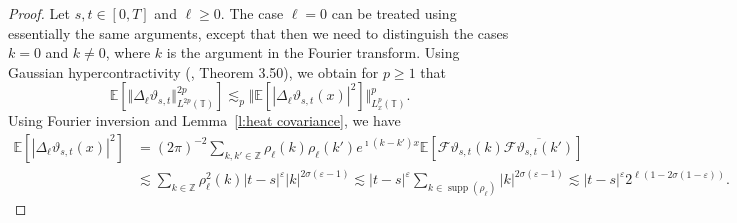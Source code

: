 \documentclass[11pt,a4paper]{article}
\newcommand{\mathd}{\mathrm{d}}
\newcommand{\tmop}[1]{\ensuremath{\operatorname{#1}}}
\theoremstyle{remark}
\newcommand{\R}{\mathbb{R}}
\newcommand{\Z}{\mathbb{Z}}
\newcommand{\E}{\mathbb{E}}
\newcommand{\CF}{\ensuremath{\mathscr{F}}}
\begin{document}
\begin{proof}
   Let $s, t \in [ 0, T ]$ and $\ell \ge 0$. The case $\ell = 0$ can be treated using essentially the same arguments, except that then we need to distinguish the cases $k= 0$ and $k\neq 0$, where $k$ is the argument in the Fourier transform. %
   Using Gaussian hypercontractivity (\cite{Janson1997}, Theorem 3.50), we obtain for $p \ge 1$ that
   \begin{equation}\label{e:burgers hypercontractivity}
      \E[\Vert  \Delta_{\ell} \vartheta_{s,t} \Vert_{L^{2 p} (\mathbb{T})}^{2 p}] \lesssim_p \Vert  \E [| \Delta_{\ell} \vartheta_{s,t}( x ) |^2] \Vert_{L^p_x ( \mathbb{T})}^p.
   \end{equation}
   Using Fourier inversion and Lemma~\ref{l:heat covariance}, we have
   \begin{align*}
      \E[| \Delta_{\ell} \vartheta_{s,t} (x)|^2] & = (2 \pi)^{-2} \sum_{k, k' \in \Z} \rho_{\ell} (k) \rho_{\ell}(k') e^{\imath (k - k') x } \E[\CF{\vartheta}_{s,t} ( k ) \overline{\CF{\vartheta}_{s,t} ( k')}] \\
      & \lesssim \sum_{k \in \Z} \rho^2_\ell(k) |t-s|^{\varepsilon} |k|^{2\sigma(\varepsilon - 1)} \lesssim |t-s|^{\varepsilon} \sum_{k \in \tmop{supp} (\rho_{\ell})} |k|^{2\sigma(\varepsilon - 1)} \lesssim |t-s|^{\varepsilon} 2^{\ell(1 - 2 \sigma (1-\varepsilon))}.
   \end{align*}
%   

\end{proof}
\end{document}
